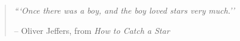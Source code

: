 \vspace*{\fill}
\begingroup
\begin{quote}
\centering
\em{```Once there was a boy, and the boy loved stars very much.'' }

-- \rm{Oliver Jeffers, from} \em{How to Catch a Star}
\end{quote}
\endgroup
\vspace*{\fill}